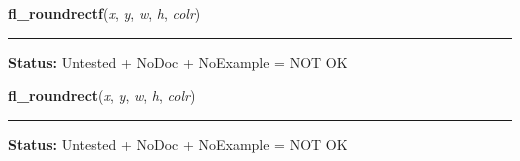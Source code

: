     \label{xformslib:library:fl_roundrectf}

    \vspace{0.5ex}

\hspace{.8\funcindent}\begin{boxedminipage}{\funcwidth}

    \raggedright \textbf{fl\_roundrectf}(\textit{x}, \textit{y}, \textit{w}, \textit{h}, \textit{colr})

    \vspace{-1.5ex}

    \rule{\textwidth}{0.5\fboxrule}
\setlength{\parskip}{2ex}
\setlength{\parskip}{1ex}
\textbf{Status:} Untested + NoDoc + NoExample = NOT OK



    \end{boxedminipage}

    \label{xformslib:library:fl_roundrect}

    \vspace{0.5ex}

\hspace{.8\funcindent}\begin{boxedminipage}{\funcwidth}

    \raggedright \textbf{fl\_roundrect}(\textit{x}, \textit{y}, \textit{w}, \textit{h}, \textit{colr})

    \vspace{-1.5ex}

    \rule{\textwidth}{0.5\fboxrule}
\setlength{\parskip}{2ex}
\setlength{\parskip}{1ex}
\textbf{Status:} Untested + NoDoc + NoExample = NOT OK



    \end{boxedminipage}

    \label{xformslib:library:fl_polygon}

    \vspace{0.5ex}

